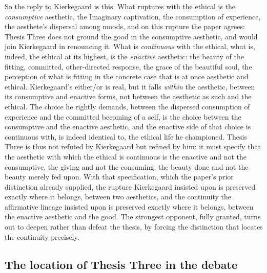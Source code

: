 So the reply to Kierkegaard is this. What ruptures with the ethical is the \emph{consumptive} aesthetic, the Imaginary captivation, the consumption of experience, the aesthete's dispersal among moods, and on this rupture the paper agrees: Thesis Three does not ground the good in the consumptive aesthetic, and would join Kierkegaard in renouncing it. What is \emph{continuous} with the ethical, what is, indeed, the ethical at its highest, is the \emph{enactive} aesthetic: the beauty of the fitting, committed, other-directed response, the grace of the beautiful soul, the perception of what is fitting in the concrete case that is at once aesthetic and ethical. Kierkegaard's either/or is real, but it falls \emph{within} the aesthetic, between its consumptive and enactive forms, not between the aesthetic as such and the ethical. The choice he rightly demands, between the dispersed consumption of experience and the committed becoming of a self, is the choice between the consumptive and the enactive aesthetic, and the enactive side of that choice is continuous with, is indeed identical to, the ethical life he championed. Thesis Three is thus not refuted by Kierkegaard but refined by him: it must specify that the aesthetic with which the ethical is continuous is the enactive and not the consumptive, the giving and not the consuming, the beauty done and not the beauty merely fed upon. With that specification, which the paper's prior distinction already supplied, the rupture Kierkegaard insisted upon is preserved exactly where it belongs, between two aesthetics, and the continuity the affirmative lineage insisted upon is preserved exactly where it belongs, between the enactive aesthetic and the good. The strongest opponent, fully granted, turns out to deepen rather than defeat the thesis, by forcing the distinction that locates the continuity precisely.

\subsection{The location of Thesis Three in the debate}
\label{p21:sub:cont-location}

